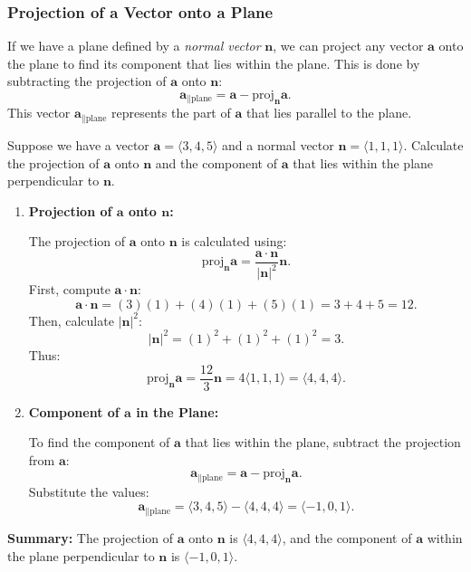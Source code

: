 \subsubsection*{Projection of a Vector onto a Plane} If we have a plane defined by a \textit{normal vector} \( \mathbf{n} \), we can project any vector \( \mathbf{a} \) onto the plane to find its component that lies within the plane. This is done by subtracting the projection of \( \mathbf{a} \) onto \( \mathbf{n} \):
\[
\mathbf{a}_{\parallel \text{plane}} = \mathbf{a} - \text{proj}_{\mathbf{n}} \mathbf{a}.
\]
This vector \( \mathbf{a}_{\parallel \text{plane}} \) represents the part of \( \mathbf{a} \) that lies parallel to the plane.


\exampleline
\begin{example}
Suppose we have a vector \( \mathbf{a} = \langle 3, 4, 5 \rangle \) and a normal vector \( \mathbf{n} = \langle 1, 1, 1 \rangle \). Calculate the projection of \( \mathbf{a} \) onto \( \mathbf{n} \) and the component of \( \mathbf{a} \) that lies within the plane perpendicular to \( \mathbf{n} \).

\begin{solution}

\begin{enumerate}
    \item \textbf{Projection of \( \mathbf{a} \) onto \( \mathbf{n} \):}

    \noindent The projection of \( \mathbf{a} \) onto \( \mathbf{n} \) is calculated using:
    \[
    \text{proj}_{\mathbf{n}} \mathbf{a} = \frac{\mathbf{a} \cdot \mathbf{n}}{|\mathbf{n}|^2} \mathbf{n}.
    \]
    First, compute \( \mathbf{a} \cdot \mathbf{n} \):
    \[
    \mathbf{a} \cdot \mathbf{n} = (3)(1) + (4)(1) + (5)(1) = 3 + 4 + 5 = 12.
    \]
    Then, calculate \( |\mathbf{n}|^2 \):
    \[
    |\mathbf{n}|^2 = (1)^2 + (1)^2 + (1)^2 = 3.
    \]
    Thus:
    \[
    \text{proj}_{\mathbf{n}} \mathbf{a} = \frac{12}{3} \mathbf{n} = 4 \langle 1, 1, 1 \rangle = \langle 4, 4, 4 \rangle.
    \]

    \item \textbf{Component of \( \mathbf{a} \) in the Plane:}

    \noindent To find the component of \( \mathbf{a} \) that lies within the plane, subtract the projection from \( \mathbf{a} \):
    \[
    \mathbf{a}_{\parallel \text{plane}} = \mathbf{a} - \text{proj}_{\mathbf{n}} \mathbf{a}.
    \]
    Substitute the values:
    \[
    \mathbf{a}_{\parallel \text{plane}} = \langle 3, 4, 5 \rangle - \langle 4, 4, 4 \rangle = \langle -1, 0, 1 \rangle.
    \]
\end{enumerate}

\noindent \textbf{Summary:} The projection of \( \mathbf{a} \) onto \( \mathbf{n} \) is \( \langle 4, 4, 4 \rangle \), and the component of \( \mathbf{a} \) within the plane perpendicular to \( \mathbf{n} \) is \( \langle -1, 0, 1 \rangle \).

\end{solution}
\end{example}
\exampleline


